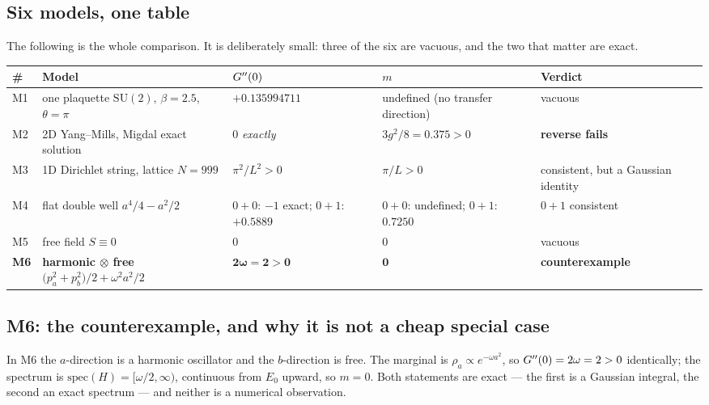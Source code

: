 \subsection{Six models, one table}

The following is the whole comparison. It is deliberately small: three of the six are vacuous,
and the two that matter are exact.

\begin{center}
\footnotesize
\begin{tabularx}{\textwidth}{@{}L{0.55cm}L{4.6cm}L{2.45cm}L{2.5cm}L{2.4cm}@{}}
\toprule
\textbf{\#} & \textbf{Model} & $G''(0)$ & $m$ & \textbf{Verdict} \\
\midrule
M1 & one plaquette $\mathrm{SU}(2)$, $\beta=2.5$, $\theta=\pi$ & $+0.135994711$ & undefined
   (no transfer direction) & vacuous \\
M2 & 2D Yang--Mills, Migdal exact solution & $0$ \emph{exactly} & $3g^{2}/8=0.375>0$
   & \textbf{reverse fails} \\
M3 & 1D Dirichlet string, lattice $N=999$ & $\pi^{2}/L^{2}>0$ & $\pi/L>0$ & consistent,
   but a Gaussian identity \\
M4 & flat double well $a^{4}/4-a^{2}/2$ & $0+0$: $-1$ exact; $0+1$: $+0.5889$ &
   $0+0$: undefined; $0+1$: $0.7250$ & $0+1$ consistent \\
M5 & free field $S\equiv0$ & $0$ & $0$ & vacuous \\
\textbf{M6} & \textbf{harmonic $\otimes$ free}
   $\bigl(p_a^{2}+p_b^{2}\bigr)/2+\omega^{2}a^{2}/2$ & $\mathbf{2\omega=2>0}$ & $\mathbf{0}$
   & \textbf{counterexample} \\
\bottomrule
\end{tabularx}
\end{center}


\subsection{M6: the counterexample, and why it is not a cheap special case}

In M6 the $a$-direction is a harmonic oscillator and the $b$-direction is free. The marginal is
$\rho_a\propto e^{-\omega a^{2}}$, so $G''(0)=2\omega=2>0$ identically; the spectrum is
$\mathrm{spec}(H)=[\omega/2,\infty)$, continuous from $E_0$ upward, so $m=0$. \LT{} Both statements
are exact --- the first is a Gaussian integral, the second an exact spectrum --- and neither is a
numerical observation.

